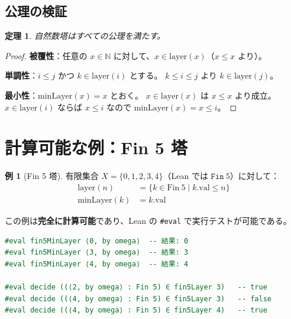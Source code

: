 \documentclass[a4paper,11pt]{ltjsarticle}
\theoremstyle{definition}
\newtheorem{example}[definition]{例}
\theoremstyle{plain}
\newtheorem{theorem}[definition]{定理}
\theoremstyle{remark}
\newcommand{\N}{\mathbb{N}}
\newcommand{\Layer}{\mathrm{layer}}
\newcommand{\minLayer}{\mathrm{minLayer}}
\begin{document}
\subsection{公理の検証}

\begin{theorem}
自然数塔はすべての公理を満たす。
\end{theorem}

\begin{proof}
\textbf{被覆性}：任意の $x \in \N$ に対して、$x \in \Layer(x)$（$x \leq x$ より）。

\textbf{単調性}：$i \leq j$ かつ $k \in \Layer(i)$ とする。
$k \leq i \leq j$ より $k \in \Layer(j)$。

\textbf{最小性}：$\minLayer(x) = x$ とおく。
$x \in \Layer(x)$ は $x \leq x$ より成立。
$x \in \Layer(i)$ ならば $x \leq i$ なので $\minLayer(x) = x \leq i$。
\end{proof}

\section{計算可能な例：Fin 5 塔}

\begin{example}[Fin 5 塔]
有限集合 $X = \{0, 1, 2, 3, 4\}$（Lean では $\mathtt{Fin}\ 5$）に対して：
\begin{align*}
    \Layer(n) &= \{k \in \mathrm{Fin}\ 5 \mid k.\mathrm{val} \leq n\} \\
    \minLayer(k) &= k.\mathrm{val}
\end{align*}
\end{example}

この例は\textbf{完全に計算可能}であり、Lean の \texttt{\#eval} で実行テストが可能である。

\begin{lstlisting}[language=ML, caption={Fin 5 塔の計算テスト}]
#eval fin5MinLayer ⟨0, by omega⟩  -- 結果: 0
#eval fin5MinLayer ⟨3, by omega⟩  -- 結果: 3
#eval fin5MinLayer ⟨4, by omega⟩  -- 結果: 4

#eval decide ((⟨2, by omega⟩ : Fin 5) ∈ fin5Layer 3)   -- true
#eval decide ((⟨4, by omega⟩ : Fin 5) ∈ fin5Layer 3)   -- false
#eval decide ((⟨4, by omega⟩ : Fin 5) ∈ fin5Layer 4)   -- true
\end{lstlisting}

\end{document}

